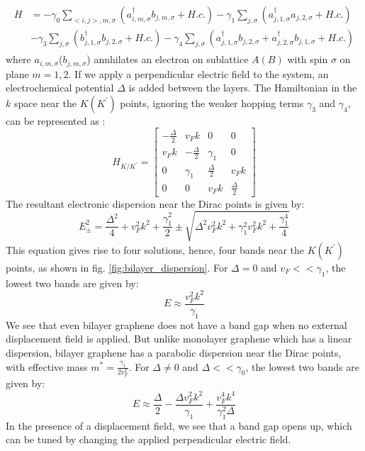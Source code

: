 \begin{align}
\begin{split}
    H & = -\gamma_0\sum_{<i,j>,m,\sigma}(a_{i,m,\sigma}^\dagger b_{j,m,\sigma}+H.c.)-\gamma_1 \sum_{j,\sigma}(a_{j,1,\sigma}^\dagger a_{j,2,\sigma}+H.c.) \\
    & -\gamma_3 \sum_{j,\sigma}(b_{j,1,\sigma}^\dagger b_{j,2,\sigma}+H.c.)-\gamma_4 \sum_{j,\sigma}(a_{j,1,\sigma}^\dagger b_{j,2,\sigma}+a_{j,2,\sigma}^\dagger b_{j,1,\sigma}+H.c.)
\end{split}
\end{align}
where $a_{i,m,\sigma}$($b_{j,m,\sigma}$) annhilates an electron on sublattice $A(B)$ with spin $\sigma$ on plane $m=1,2$. If we apply a perpendicular electric field to the system, an electrochemical potential $\Delta$ is added between the layers. The Hamiltonian in the $k$ space near the $K(K^\prime)$ points, ignoring the weaker hopping terms $\gamma_3$ and $\gamma_4$, can be represented as \cite{Geim}: 
\begin{equation}
    H_{K/K^\prime} = \begin{bmatrix}
    -\frac{\Delta}{2} & v_Fk & 0 & 0 \\
    v_Fk & -\frac{\Delta}{2} & \gamma_1 & 0 \\
    0 & \gamma_1 & \frac{\Delta}{2} & v_Fk \\
    0 & 0 & v_Fk & \frac{\Delta}{2}
\end{bmatrix}
\end{equation}
The resultant electronic dispersion near the Dirac points is given by:
\begin{equation}
    E_\pm^2 = \frac{\Delta^2}{4}+v_F^2k^2+\frac{\gamma_1^2}{2}\pm\sqrt{\Delta^2v_F^2k^2+\gamma_1^2v_F^2k^2+\frac{\gamma_1^4}{4}}
\end{equation}
This equation gives rise to four solutions, hence, four bands near the $K(K^\prime)$ points, as shown in fig. \ref{fig:bilayer_dispersion}. For $\Delta=0$ and  $v_F<<\gamma_1$, the lowest two bands are given by:
\begin{equation}
    E\approx\frac{v_F^2k^2}{\gamma_1}
\end{equation}
We see that even bilayer graphene does not have a band gap when no external displacement field is applied. But unlike monolayer graphene which has a linear dispersion, bilayer graphene has a parabolic dispersion near the Dirac points, with effective mass $m^*=\frac{\gamma_1}{2v_F^2}$.
For $\Delta\neq 0$ and $\Delta<<\gamma_0$, the lowest two bands are given by:
\begin{equation}
    E \approx \frac{\Delta}{2}-\frac{ \Delta v^{2}_{F} k^{2}}{\gamma_1}+\frac{v^{4}_F k^{4}}{ \gamma_1^{2} \Delta}
\end{equation}
In the presence of a displacement field, we see that a band gap opens up, which can be tuned by changing the applied perpendicular electric field.

